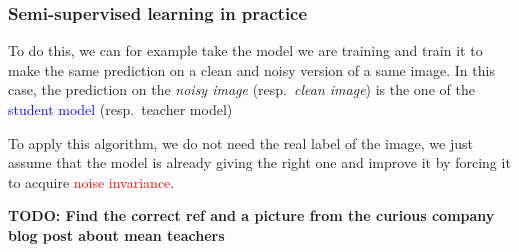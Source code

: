 \documentclass[10pt]{beamer}
\begin{document}
\begin{frame}
  \frametitle{Semi-supervised learning in practice}

  To do this, we can for example take the model we are training and
  train it to make the same prediction on a clean and noisy version of
  a same image. In this case, the prediction on the \emph{noisy image}
  (resp.\ \emph{clean image}) is the one of the
  \textcolor{blue}{student model} (resp.\ teacher model)

  \bigskip

  To apply this algorithm, we do not need the real label of the image,
  we just assume that the model is already giving the right one and
  improve it by forcing it to acquire \textcolor{red}{noise
    invariance}.

  \bigskip

  \textbf{TODO: Find the correct ref and a picture from the curious
    company blog post about mean teachers}

\end{frame}
\end{document}

